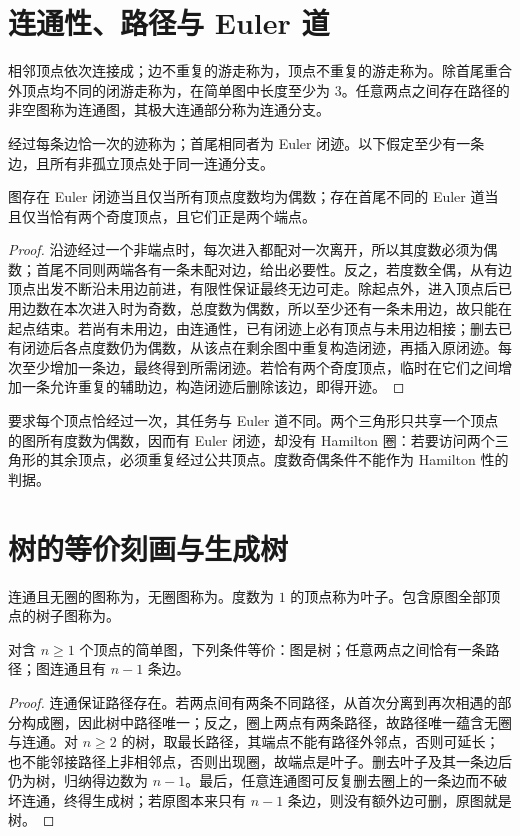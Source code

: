 \documentclass[UTF8,12pt,a4paper,fontset=fandol]{ctexbook}
\begin{document}
\section{连通性、路径与 Euler 道}

相邻顶点依次连接成；边不重复的游走称为，顶点不重复的游走称为。除首尾重合外顶点均不同的闭游走称为，在简单图中长度至少为 $3$。任意两点之间存在路径的非空图称为连通图，其极大连通部分称为连通分支。

经过每条边恰一次的迹称为；首尾相同者为 Euler 闭迹。以下假定至少有一条边，且所有非孤立顶点处于同一连通分支。

\begin{theorem}
图存在 Euler 闭迹当且仅当所有顶点度数均为偶数；存在首尾不同的 Euler 道当且仅当恰有两个奇度顶点，且它们正是两个端点。
\end{theorem}
\begin{proof}
沿迹经过一个非端点时，每次进入都配对一次离开，所以其度数必须为偶数；首尾不同则两端各有一条未配对边，给出必要性。反之，若度数全偶，从有边顶点出发不断沿未用边前进，有限性保证最终无边可走。除起点外，进入顶点后已用边数在本次进入时为奇数，总度数为偶数，所以至少还有一条未用边，故只能在起点结束。若尚有未用边，由连通性，已有闭迹上必有顶点与未用边相接；删去已有闭迹后各点度数仍为偶数，从该点在剩余图中重复构造闭迹，再插入原闭迹。每次至少增加一条边，最终得到所需闭迹。若恰有两个奇度顶点，临时在它们之间增加一条允许重复的辅助边，构造闭迹后删除该边，即得开迹。
\end{proof}

要求每个顶点恰经过一次，其任务与 Euler 道不同。两个三角形只共享一个顶点的图所有度数为偶数，因而有 Euler 闭迹，却没有 Hamilton 圈：若要访问两个三角形的其余顶点，必须重复经过公共顶点。度数奇偶条件不能作为 Hamilton 性的判据。

\section{树的等价刻画与生成树}

\begin{definition}
连通且无圈的图称为，无圈图称为。度数为 $1$ 的顶点称为叶子。包含原图全部顶点的树子图称为。
\end{definition}

\begin{theorem}
对含 $n\ge1$ 个顶点的简单图，下列条件等价：图是树；任意两点之间恰有一条路径；图连通且有 $n-1$ 条边。
\end{theorem}
\begin{proof}
连通保证路径存在。若两点间有两条不同路径，从首次分离到再次相遇的部分构成圈，因此树中路径唯一；反之，圈上两点有两条路径，故路径唯一蕴含无圈与连通。对 $n\ge2$ 的树，取最长路径，其端点不能有路径外邻点，否则可延长；也不能邻接路径上非相邻点，否则出现圈，故端点是叶子。删去叶子及其一条边后仍为树，归纳得边数为 $n-1$。最后，任意连通图可反复删去圈上的一条边而不破坏连通，终得生成树；若原图本来只有 $n-1$ 条边，则没有额外边可删，原图就是树。
\end{proof}
\end{document}
